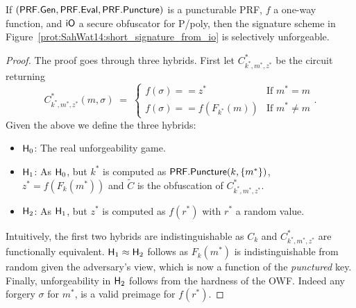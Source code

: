 \begin{theorem}
	\label{theo:SahWat14:short_signatures_from_io}
	If $(\mathsf{PRF.Gen}, \mathsf{PRF.Eval}, \mathsf{PRF.Puncture})$ is a puncturable PRF, $f$ a one-way function, and $\mathsf{iO}$ a secure obfuscator for P/poly, then the signature scheme in Figure~\ref{prot:SahWat14:short_signature_from_io} is selectively unforgeable.
\end{theorem}
\begin{proof}
	The proof goes through three hybrids. First let $C^\ast_{k^\ast, m^\ast, z^\ast}$ be the circuit returning
	\[
	C^\ast_{k^\ast, m^\ast, z^\ast}(m, \sigma)
		\; = \;
	\begin{cases}
		f(\sigma) == z^\ast & \text{If } m^\ast = m
			\\
		f(\sigma) == f(F_{k^\ast}(m)) & \text{If } m^\ast \neq m
	\end{cases}.
	\]
	Given the above we define the three hybrids:
	\begin{itemize}
	\item{$\mathsf{H}_0$:} The real unforgeability game.
	
	\item{$\mathsf{H}_1$:} As $\mathsf{H}_0$, but $k^\ast$ is computed as $\mathsf{PRF.Puncture}(k, \{m^\ast\})$, $z^\ast = f(F_k(m^\ast))$ and $\tilde{C}$ is the obfuscation of $C^\ast_{k^\ast, m^\ast, z^\ast}$.
	
	\item{$\mathsf{H}_2$:} As $\mathsf{H}_1$, but $z^\ast$ is computed as $f(r^\ast)$ with $r^\ast$ a random value.
	\end{itemize}
	
	Intuitively, the first two hybrids are indistinguishable as $C_k$ and $C^\ast_{k^\ast, m^\ast, z^\ast}$ are functionally equivalent.
	$\mathsf{H}_1 \approx \mathsf{H}_2$ follows as $F_k(m^\ast)$ is indistinguishable from random given the adversary's view, which is now a function of the \textit{punctured} key.
	Finally, unforgeability in $\mathsf{H}_2$ follows from the hardness of the OWF.
	Indeed any forgery $\sigma$ for $m^\ast$, is a valid preimage for $f(r^\ast)$.
\end{proof}